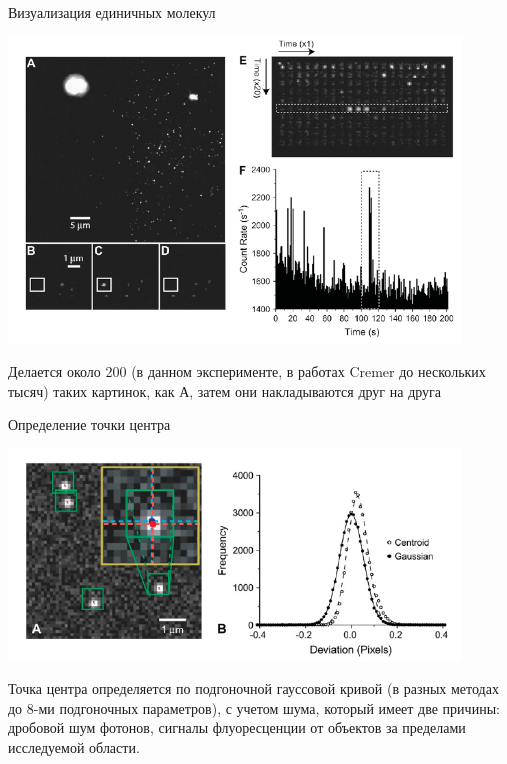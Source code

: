 \documentclass[9pt, compress, xcolor=table]{beamer}
\begin{document}
\begin{frame}{Визуализация единичных молекул}
\begin{center}
\includegraphics[width=0.9\textwidth]{lm5}

Делается около 200 (в данном эксперименте, в работах Cremer до нескольких тысяч) таких картинок, как А, затем они накладываются друг на друга

\end{center}
\end{frame}

\begin{frame}{Определение точки центра}
\begin{center}
\includegraphics[width=0.9\textwidth]{lm3}

Точка центра определяется по подгоночной гауссовой кривой (в разных методах до 8-ми подгоночных параметров), с учетом шума, который имеет две причины: дробовой шум фотонов, сигналы флуоресценции от объектов за пределами исследуемой области.

\end{center}
\end{frame}
\end{document}
